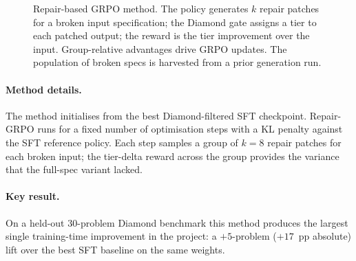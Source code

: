 \documentclass[11pt]{article}
\begin{document}
\begin{figure}[t]
\centering
{}
\caption{Repair-based GRPO method. The policy generates $k$ repair
patches for a broken input specification; the Diamond gate assigns a
tier to each patched output; the reward is the tier improvement over
the input. Group-relative advantages drive GRPO updates. The
population of broken specs is harvested from a prior generation run.}
\label{fig:repair-flow}
\end{figure}

\paragraph{Method details.} The method initialises from the best
Diamond-filtered SFT checkpoint. Repair-GRPO runs for a fixed
number of optimisation steps with a KL penalty against the
SFT reference policy. Each step samples a group of $k=8$
repair patches for each broken input; the tier-delta reward
across the group provides the variance that the full-spec
variant lacked.

\paragraph{Key result.} On a held-out $30$-problem Diamond benchmark
this method produces the largest single training-time improvement in
the project: a $+5$-problem ($+17$~pp absolute) lift over the best
SFT baseline on the same weights.
\end{document}
